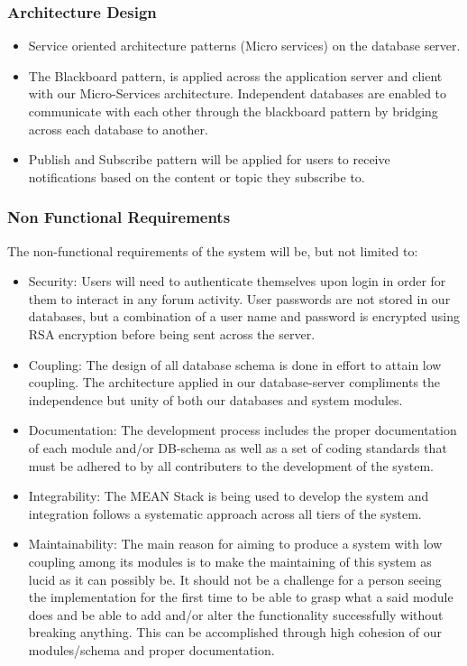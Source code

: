 \documentclass[12pt]{article}
\begin{document}
\subsubsection{Architecture Design}
\begin{itemize}
\item Service oriented architecture patterns (Micro services) on the database server.
\item The Blackboard pattern, is applied across the application server and client with our Micro-Services architecture. Independent databases are enabled to communicate with each other through the blackboard pattern by bridging across each database to another.
\item Publish and Subscribe pattern will be applied for users to receive notifications based on the content or topic they subscribe to. 
\end{itemize}
\subsubsection{Non Functional Requirements}
\par{The non-functional requirements of the system will be, but not limited to:}
\begin{itemize}
\item Security: Users will need to authenticate themselves upon login in order for them to interact in any forum activity. User passwords are not stored in our databases, but a combination of a user name and password is encrypted using RSA encryption before being sent across the server. 
\item Coupling: The design of all database schema is done in effort to attain low coupling. The architecture applied in our database-server compliments the independence but unity of both our databases and system modules.
\item Documentation: The development process includes the proper documentation of each module and/or DB-schema as well as a set of coding standards that must be adhered to by all contributers to the development of the system.
\item Integrability: The MEAN Stack is being used to develop the system and integration follows a systematic approach across all tiers of the system.
\item Maintainability: The main reason for aiming to produce a system with low coupling among its modules is to make the maintaining of this system as lucid as it can possibly be. It should not be a challenge for a person seeing the implementation for the first time to be able to grasp what a said module does and be able to add and/or alter the functionality successfully without breaking anything. This can be accomplished through high cohesion of our modules/schema and proper documentation. 
\end{itemize}
\end{document}
